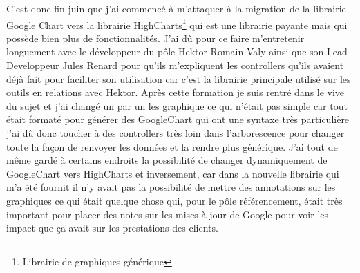 \documentclass[12pt]{article}
\begin{document}
        C'est donc fin juin que j'ai commencé à m'attaquer à la migration de la librairie Google Chart vers la librairie HighCharts\footnote{Librairie de graphiques générique} qui est une librairie payante mais qui possède bien plus de fonctionnalités. J'ai dû pour ce faire m'entretenir longuement avec le développeur du pôle Hektor Romain Valy  ainsi que son Lead Developpeur Jules Renard pour qu'ils m'expliquent les controllers qu'ils avaient déjà fait pour faciliter son utilisation car c'est la librairie principale utilisé sur les outils en relations avec Hektor. 
        Après cette formation je suis rentré dans le vive du sujet et j'ai changé un par un les graphique ce qui n'était pas simple car tout était formaté pour générer des GoogleChart qui ont une syntaxe très particulière j'ai dû donc toucher à des controllers très loin dans l'arborescence pour changer toute la façon de renvoyer les données et la rendre plus générique. J'ai tout de même gardé à certains endroits la possibilité de changer dynamiquement de  GoogleChart vers HighCharts et inversement, car dans la nouvelle librairie qui m'a été fournit il n'y avait pas la possibilité de mettre des annotations sur les graphiques ce qui était quelque chose qui, pour le pôle référencement, était très important pour placer des notes sur les mises à jour de Google pour voir les impact que ça avait sur les prestations des clients.
        
\end{document}
